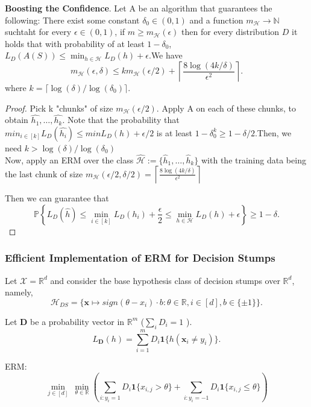 \begin{thm}
	\textbf{Boosting the Confidence}.
	Let A be an algorithm that guarantees the following:
	There exist some constant $\delta_0 \in (0,1)$ and a function $m_\mathcal{H}\rightarrow \mathbb{N}$ 
	suchtaht for every $\epsilon \in (0, 1)$, if $m \ge m_\mathcal{H}(\epsilon)$ then for
	every distribution $D$ it holds that with probability of at least $1-\delta_0$,
	$L_D(A(S)) \le \min_{h\in\mathcal{H}} L_D(h) + \epsilon$.We have
	\[
		m_\mathcal{H}(\epsilon, \delta) \le k m_\mathcal{H}(\epsilon / 2) + 
		\left\lceil \frac{8 \log (4k/\delta) }{ \epsilon^2 } \right\rceil
	.\]
	where $k = \lceil \log(\delta) / \log (\delta_0) \rceil$.
\end{thm}
\begin{proof}
	Pick k "chunks" of size $m_\mathcal{H}(\epsilon/2)$. Apply A on each of these chunks, to
	obtain $\hat{h_1},\dots, \hat{h_k}$. Note that the probability that
	$min_{i\in[k]} L_D(\hat{h_i}) \le min L_D(h) + \epsilon/2$ is at least 
	$1-\delta^k_0 \ge 1-\delta/2$.Then, we need $k > \log(\delta) / \log (\delta_0)$ \\

	Now, apply an ERM over the class $\hat{\mathcal{H}} := \{ \hat{h}_1, \dots, \hat{h}_k \} $
	with the training data being the last chunk of size 
	$m_\mathcal{H}(\epsilon/2, \delta/2) =
		\left\lceil \frac{8 \log (4k/\delta) }{ \epsilon^2 } \right\rceil$

	Then we can guarantee that
	\[
		\mathbb{P} \left\{ L_D(\hat{h}) \le \min\limits_{i\in[k]} L_D(h_i) + \frac{\epsilon}{2}
		\le \min\limits_{h\in\mathcal{H}} L_D(h) + \epsilon \right\} \ge 1-\delta
	.\]
\end{proof}

\subsubsection{Efficient Implementation of ERM for Decision Stumps}

Let $\mathcal{X} = \mathbb{R}^d$ and consider the base hypothesis class of decision stumps
over $\mathbb{R}^d$, namely,
\[
	\mathcal{H}_{DS} = \{ \mathbf{x} \mapsto sign(\theta - x_i) \cdot b : 
	\theta \in \mathbb{R}, i \in [d], b \in \{ \pm 1 \} \}
.\]

Let $\mathbf{D}$ be a probability vector in $\mathbb{R}^m$ ($\sum_i D_i = 1$ ).
 \[
	 L_{\mathbf{D}}(h) = \sum\limits^m_{i=1} D_i \mathbf{1} \{ h( \mathbf{x}_i \ne y_i ) \}
.\]

ERM:
\begin{equation}
	\label{equ10_1}
	 \underset{j\in[d]}{\min}\ \underset{\theta \in \mathbb{R}} {\min} 
	 \left(
	 \sum\limits_{i:y_i=1} D_i \mathbf{1} \{ x_{i,j} > \theta \}
 + \sum\limits_{i:y_i=-1} D_i \mathbf{1} \{  x_{i,j} \le \theta \}
	 \right)
\end{equation}

